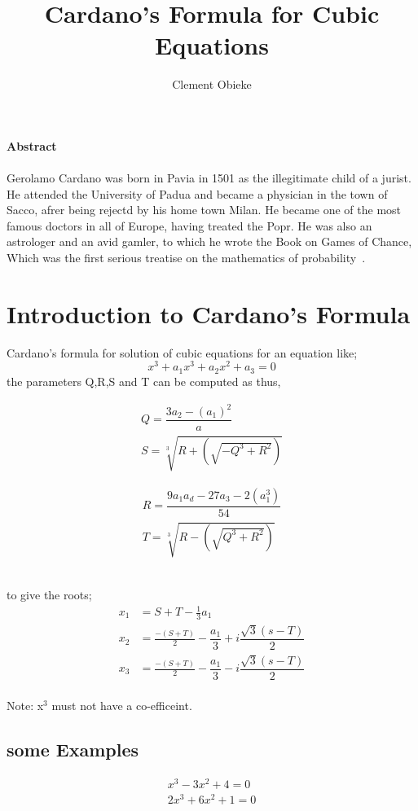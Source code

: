 \documentclass[12pt]{article}
\title{Cardano's Formula for Cubic Equations}
\author{Clement Obieke}
\begin{document}
	\maketitle
	
\centering	\textbf{\large Abstract}
			\paragraph{}
			Gerolamo Cardano was born in Pavia in 1501 as the illegitimate child of a jurist. He attended the University of Padua and became a physician in the town of Sacco, afrer being rejectd by his home town Milan. He became one of the most famous doctors in all of Europe, having treated the Popr. He was also an astrologer and an avid gamler, to which he wrote the Book on Games of Chance, Which was the first serious treatise on the mathematics of probability~\cite{Cardano.S}.

\raggedright
\section{Introduction to Cardano's Formula}

	Cardano's formula for solution of cubic equations for an equation like;\\
	\begin{equation*}
		x^{3} + a_{1}x^{3} +a_{2}x^{2}+a_{3} = 0
	\end{equation*}
	the parameters  Q,R,S and T can be computed as thus,\\
	\begin{minipage}{0.4\linewidth}
			\begin{align*}
			Q=\dfrac{3a_{2}-(a_{1})^{2}}{a}\\
			S=\sqrt[3]{R+(\sqrt{-Q^{3}+R^{2}})}
	 		\end{align*}
 	\end{minipage}
 	\begin{minipage}{0.1\linewidth}
 	\begin{align*}
 		R=\dfrac{9a_{1}a_{d}-27a_{3}-2(a_{1}^{3})}{54}\\ 
 		T=\sqrt[3]{R-(\sqrt{Q^{3}+R^{2}})}
 	\end{align*}
	 \end{minipage}\\
 	to give the roots;\\
 	

 	\begin{align*} 		
 		x_{1}&=S+T-\frac{1}{3}a_{1}\\
 		x_{2}&=\frac{-(S+T)}{2}-\dfrac{a_{1}}{3}+i\dfrac{\sqrt{3}(s-T)}{2} \\  
 		x_{3}&=\frac{-(S+T)}{2}-\dfrac{a_{1}}{3}-i\dfrac{\sqrt{3}(s-T)}{2} 
 	\end{align*}\\
  Note: x$^{3}$ must not have a co-efficeint.

 \subsection{some Examples}

 	\begin{align*}
 		x^{3}-3x^{2}+4 =0\\
 		2x^{3}+6x^{2}+1=0
 	\end{align*}\\
 
 
\end{document}
